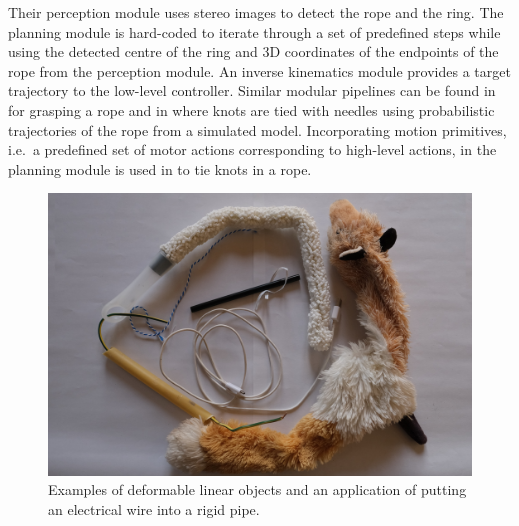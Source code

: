 Their perception module uses stereo images to detect the rope and the ring. The planning module is hard-coded to iterate through a set of predefined steps while using the detected centre of the ring and 3D coordinates of the endpoints of the rope from the perception module. An inverse kinematics module provides a target trajectory to the low-level controller. Similar modular pipelines can be found in \autocite{Remde1999} for grasping a rope and in \autocite{Saha2007} where knots are tied with needles using probabilistic trajectories of the rope from a simulated model. Incorporating motion primitives, i.e.\ a predefined set of motor actions corresponding to high-level actions, in the planning module is used in \autocite{Yamakawa2008, Vinh2012} to tie knots in a rope.

\begin{figure}[htbp!]
    \centering
    \includegraphics[keepaspectratio,width=\textwidth]{figures/fig_dlos.JPG}
    \caption[Real-life examples of deformable linear objects.]{Examples of deformable linear objects and an application of putting an electrical wire into a rigid pipe.}
    \label{fig:dlo_examples}
\end{figure}

